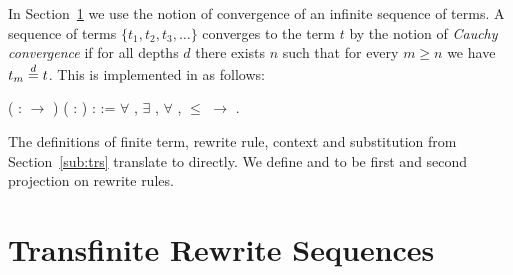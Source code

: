 In Section~\ref{sec:seq} we use the notion of convergence of an infinite
sequence of terms. A sequence of terms $\{ t_1, t_2, t_3, \ldots \}$ converges
to the term $t$ by the notion of \emph{Cauchy convergence} if for all depths
$d$ there exists $n$ such that for every $m \geq n$ we have $t_m \overset{d}{=}
t$. This is implemented in \Coq as follows:
\begin{singlespace}
\begin{coqdoccode}
\coqdocnoindent
{}
( :
\ensuremath{\rightarrow} )
( : ) :
 :=\coqdoceol
\coqdocindent{1.00em}
\ensuremath{\forall} , \ensuremath{\exists} ,
\ensuremath{\forall} ,
 \ensuremath{\le} 
\ensuremath{\rightarrow}
 
.
\end{coqdoccode}
\end{singlespace}

The definitions of finite term, rewrite rule, context and substitution from
Section~\ref{sub:trs} translate to \Coq directly. We define
 and  to be first and second
projection on rewrite rules.


\section{Transfinite Rewrite Sequences}\label{sec:seq}

